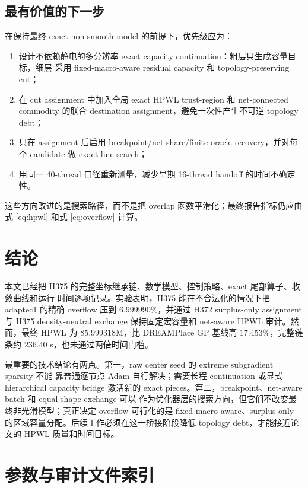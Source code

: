 \documentclass[UTF8,a4paper,11pt]{ctexrep}
\begin{document}
\section{最有价值的下一步}
在保持最终 exact non-smooth model 的前提下，优先级应为：
\begin{enumerate}
  \item 设计不依赖静电的多分辨率 exact capacity continuation：粗层只生成容量目标，细层
        采用 fixed-macro-aware residual capacity 和 topology-preserving cut；
  \item 在 cut assignment 中加入全局 exact HPWL trust-region 和 net-connected commodity
        的联合 destination assignment，避免一次性产生不可逆 topology debt；
  \item 只在 assignment 后启用 breakpoint/net-share/finite-oracle recovery，并对每个
        candidate 做 exact line search；
  \item 用同一 40-thread 口径重新测量，减少早期 16-thread handoff 的时间不确定性。
\end{enumerate}
这些方向改进的是搜索路径，而不是把 overlap 函数平滑化；最终报告指标仍应由式
\eqref{eq:hpwl} 和式 \eqref{eq:overflow} 计算。

\chapter{结论}

本文已经把 H375 的完整坐标继承链、数学模型、控制策略、exact 尾部算子、收敛曲线和运行
时间逐项记录。实验表明，H375 能在不合法化的情况下把 adaptec1 的精确 overflow 压到
$6.999990\%$，并通过 H372 surplus-only assignment 与 H375 density-neutral exchange
保持固定宏容量和 net-aware HPWL 审计。然而，最终 HPWL 为 $85.999318$M，比 DREAMPlace
GP 基线高 $17.453\%$，完整链条约 $236.40$ s，也未通过两倍时间门槛。

最重要的技术结论有两点。第一，raw center seed 的 extreme subgradient sparsity 不能
靠普通逐节点 Adam 自行解决；需要长程 continuation 或显式 hierarchical capacity bridge
激活新的 exact pieces。第二，breakpoint、net-aware batch 和 equal-shape exchange 可以
作为优化器层的搜索方向，但它们不改变最终非光滑模型；真正决定 overflow 可行化的是
fixed-macro-aware、surplus-only 的区域容量分配。后续工作必须在这一桥接阶段降低 topology
debt，才能接近论文的 HPWL 质量和时间目标。

\appendix
\chapter{参数与审计文件索引}
\end{document}
